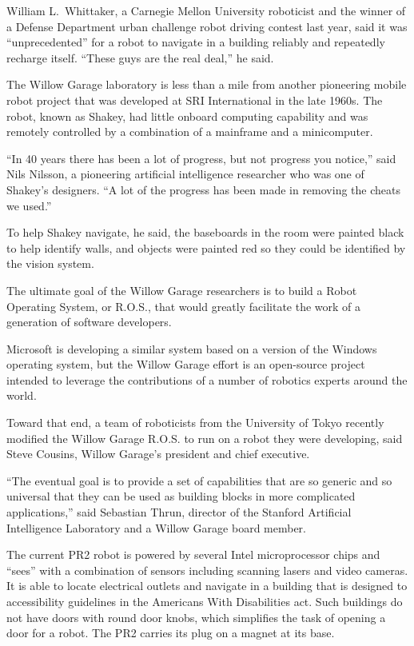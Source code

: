 \documentclass[12pt,a4paper,onecolumn]{article}
\begin{document}
William L.~Whittaker, a Carnegie Mellon University roboticist and the winner of a Defense Department
urban challenge robot driving contest last year, said it was ``unprecedented'' for a robot to
navigate in a building reliably and repeatedly recharge itself. ``These guys are the real deal,'' he
said.

The Willow Garage laboratory is less than a mile from another pioneering mobile robot project that
was developed at SRI International in the late 1960s. The robot, known as Shakey, had little onboard
computing capability and was remotely controlled by a combination of a mainframe and a minicomputer.

``In 40 years there has been a lot of progress, but not progress you notice,'' said Nils Nilsson, a
pioneering artificial intelligence researcher who was one of Shakey's designers. ``A lot of the
progress has been made in removing the cheats we used.''

To help Shakey navigate, he said, the baseboards in the room were painted black to help identify
walls, and objects were painted red so they could be identified by the vision system.

The ultimate goal of the Willow Garage researchers is to build a Robot Operating System, or R.O.S.,
that would greatly facilitate the work of a generation of software developers.

Microsoft is developing a similar system based on a version of the Windows operating system, but the
Willow Garage effort is an open-source project intended to leverage the contributions of a number of
robotics experts around the world.

Toward that end, a team of roboticists from the University of Tokyo recently modified the Willow
Garage R.O.S. to run on a robot they were developing, said Steve Cousins, Willow Garage's president
and chief executive.

``The eventual goal is to provide a set of capabilities that are so generic and so universal that
they can be used as building blocks in more complicated applications,'' said Sebastian Thrun,
director of the Stanford Artificial Intelligence Laboratory and a Willow Garage board member.

The current PR2 robot is powered by several Intel microprocessor chips and ``sees'' with a
combination of sensors including scanning lasers and video cameras. It is able to locate electrical
outlets and navigate in a building that is designed to accessibility guidelines in the Americans
With Disabilities act. Such buildings do not have doors with round door knobs, which simplifies the
task of opening a door for a robot. The PR2 carries its plug on a magnet at its base.
\end{document}
